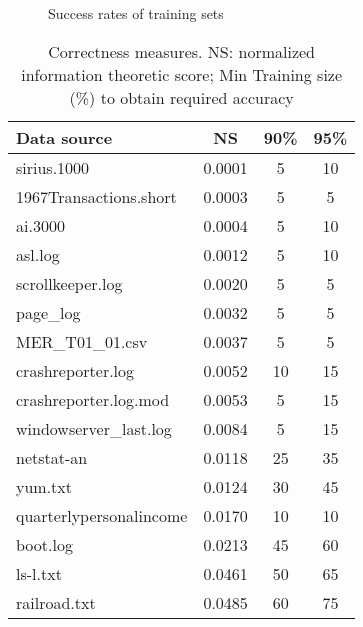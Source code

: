 \begin{figure}
\caption{Success rates of training sets} \label{fig:trainsucc} \shrink
\end{figure}

\begin{table}
\begin{center}
\begin{tabular}{|l||c|c|c|} \hline
Data source		  & NS  			& 90\% 		& 95\% \\ \hline \hline
sirius.1000            & 0.0001		& 5		& 10 \\ \hline
1967Transactions.short	& 0.0003		& 5		& 5 \\ \hline
ai.3000                 & 0.0004		& 5		& 10 \\ \hline
asl.log                 & 0.0012		& 5		& 10\\ \hline
scrollkeeper.log        & 0.0020		& 5		& 5\\ \hline
page\_log               & 0.0032		& 5		& 5\\ \hline
MER\_T01\_01.csv        & 0.0037		& 5		& 5 \\ \hline
crashreporter.log       & 0.0052		& 10		& 15\\ \hline
crashreporter.log.mod   & 0.0053		& 5		& 15\\ \hline
windowserver\_last.log  & 0.0084		& 5		& 15\\ \hline
netstat-an              & 0.0118		& 25		& 35\\ \hline
yum.txt                 & 0.0124		& 30		& 45\\ \hline
quarterlypersonalincome & 0.0170		& 10		& 10\\ \hline
boot.log                & 0.0213		& 45		& 60\\ \hline
ls-l.txt                & 0.0461		& 50		& 65 \\ \hline
railroad.txt            & 0.0485		& 60		& 75\\ \hline
\end{tabular}
\caption{Correctness measures.  NS: normalized information theoretic score;
Min Training size (\%) to obtain required accuracy} \shrink
\label{tab:correlate}
\end{center}
\end{table}




